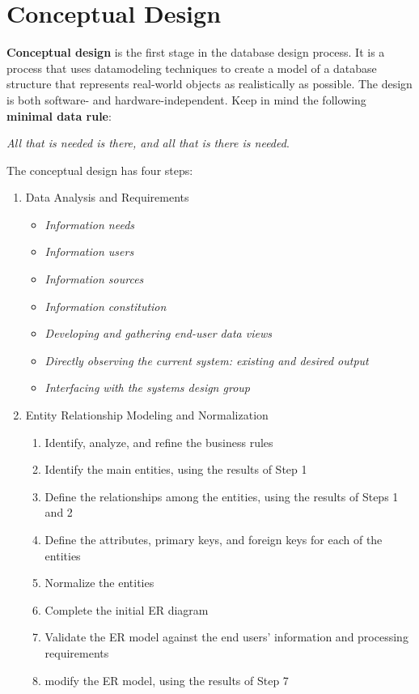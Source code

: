 \documentclass[a4paper, 12pt, titlepage]{report}
\begin{document}
\section{Conceptual Design}
\textbf{Conceptual design} is the first stage in the database design process. It is a process that uses datamodeling techniques to create a model of a database structure that represents real-world objects as realistically as possible. The design is both software- and hardware-independent. Keep in mind the following \textbf{minimal data rule}:
\begin{center}
\emph{All that is needed is there, and all that is there is needed}.
\end{center}
The conceptual design has four steps:
\begin{enumerate}
\item Data Analysis and Requirements
\begin{itemize}
\item \emph{Information needs}
\item \emph{Information users}
\item \emph{Information sources}
\item \emph{Information constitution}
\item \emph{Developing and gathering end-user data views}
\item \emph{Directly observing the current system: existing and desired output}
\item \emph{Interfacing with the systems design group}
\end{itemize}
\item Entity Relationship Modeling and Normalization
\begin{enumerate}
\item Identify, analyze, and refine the business rules
\item Identify the main entities, using the results of Step 1
\item Define the relationships among the entities, using the results of Steps 1 and 2
\item Define the attributes, primary keys, and foreign keys for each of the entities
\item Normalize the entities
\item Complete the initial ER diagram
\item Validate the ER model against the end users’ information and processing requirements
\item modify the ER	model, using the results of Step 7
\end{enumerate}

\end{enumerate}
\end{document}
